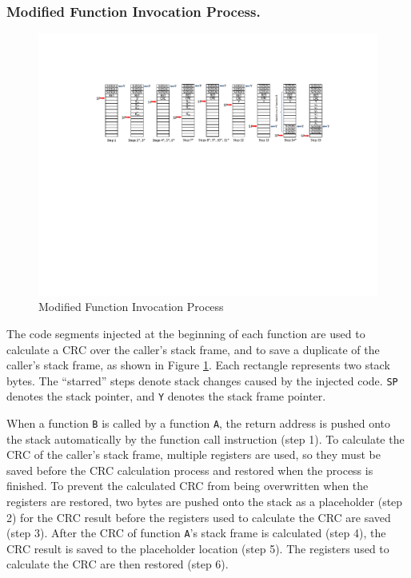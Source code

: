\subsubsection{Modified Function Invocation Process.}
\begin{figure}
	\vspace{-25pt}
	\centering
	\includegraphics[width=1.0\textwidth]{figures/modified_function_operations_stack_pre_execution_v3}
	\vspace{-15pt}
	\caption{Modified Function Invocation Process}\label{fig:modified_function_operation_pre_execution}
\end{figure}
The code segments injected at the beginning of each function are used to calculate a CRC over the caller's stack frame, and to save a duplicate of the caller's stack frame, as shown in Figure \ref{fig:modified_function_operation_pre_execution}. Each rectangle represents two stack bytes. The ``starred'' steps denote stack changes caused by the injected code. \texttt{SP} denotes the stack pointer, and \texttt{Y} denotes the stack frame pointer.

When a function \texttt{B} is called by a function \texttt{A}, the return address is pushed onto the stack automatically by the function call instruction (step 1). To calculate the CRC of the caller's stack frame, multiple registers are used, so they must be saved before the CRC calculation process and restored when the process is finished. To prevent the calculated CRC from being overwritten when the registers are restored, two bytes are pushed onto the stack as a placeholder (step 2) for the CRC result before the registers used to calculate the CRC are saved (step 3). After the CRC of function \texttt{A}'s stack frame is calculated (step 4), the CRC result is saved to the placeholder location (step 5). The registers used to calculate the CRC are then restored (step 6).

